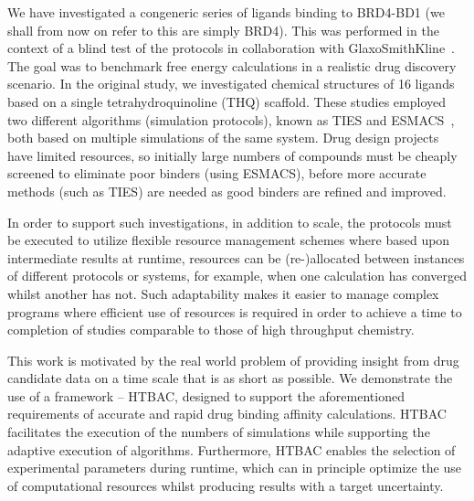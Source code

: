\documentclass[conference]{IEEEtran}
\begin{document}
We have investigated a congeneric series of ligands binding to BRD4-BD1 (we shall
from now on refer to this are simply BRD4). This was performed in the context
of a blind test of the protocols in collaboration with
GlaxoSmithKline~\cite{Wan2017brd4}. The goal was to benchmark free energy 
calculations in a realistic drug discovery scenario. In the original study,
we investigated chemical structures of 16 ligands based on a single
tetrahydroquinoline (THQ) scaffold. These studies employed two different
algorithms (simulation protocols), known as TIES and ESMACS~\cite{Bhati2017},
both based on multiple simulations of the same system. Drug design projects
have limited resources, so initially large numbers of compounds must be
cheaply screened to eliminate poor binders (using ESMACS), before more
accurate methods (such as TIES) are needed as good binders are refined and
improved.

In order to support such investigations, in addition to scale, the protocols
must be executed to utilize  flexible resource management schemes where based
upon intermediate results at runtime, resources can be (re-)allocated between
instances of different protocols or systems, for example, when one calculation
has converged whilst another has not. Such adaptability makes it easier to
manage complex programs where efficient use of resources is required in order
to achieve a time to completion of studies comparable to those of high
throughput chemistry.

This work is motivated by the real world problem of providing insight
from drug candidate data on a time scale that is as short as possible. 
We 
demonstrate the use of a framework -- HTBAC, designed to
support the aforementioned requirements of accurate and rapid drug binding
affinity calculations. HTBAC facilitates the execution of the numbers of
simulations while supporting the adaptive execution of algorithms.
Furthermore, HTBAC enables the selection of experimental parameters during
runtime, which can in principle optimize the use of computational resources
whilst producing results with a target uncertainty.


\end{document}
